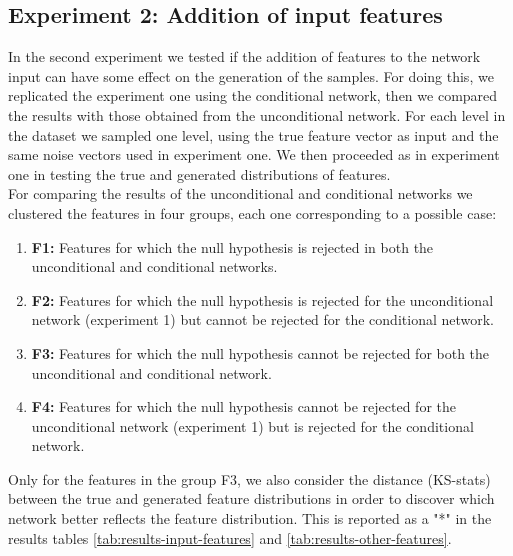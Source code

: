 \subsection{Experiment 2: Addition of input features}
\label{sec:experiment-2}
In the second experiment we tested if the addition of features to the network input can have some effect on the generation of the samples. For doing this, we replicated the experiment one using the conditional network, then we compared the results with those obtained from the unconditional network. For each level in the dataset we sampled one level, using the true feature vector as input and
the same noise vectors used in experiment one. We then proceeded as in experiment one in testing the true and generated distributions of features. \\
For comparing the results of the unconditional and conditional networks we clustered the features in four groups, each one corresponding to a possible case: \\
\begin{enumerate}
	\item \textbf{F1:} Features for which the null hypothesis is rejected in both the unconditional and conditional networks. 
	\item \textbf{F2:} Features for which the null hypothesis is rejected for the unconditional network (experiment 1) but cannot be rejected for the conditional network. 
	\item \textbf{F3:} Features for which the null hypothesis cannot be rejected for both the unconditional  and conditional network.
	\item \textbf{F4:} Features for which the null hypothesis cannot be rejected for the unconditional network (experiment 1) but is rejected for the conditional network.
\end{enumerate}

Only for the features in the group F3, we also consider the distance (KS-stats) between the true and generated feature distributions in order to discover which network better reflects the feature distribution. This is reported as a "*" in the results tables \ref{tab:results-input-features} and \ref{tab:results-other-features}.

